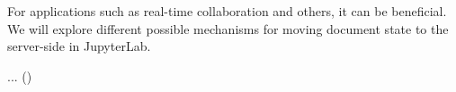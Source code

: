 \begin{task}[
  title=Server-side Document State,
  id=server-state,
  lead=UPSUD,
  PM=20,
  wphases={0-48},
  partners={UPSUD,SRL,QS}
]
  For applications such as real-time collaboration and others,
  it can be beneficial.
  We will explore different possible mechanisms for moving document state
  to the server-side in JupyterLab.

  \begin{compactitem}
  \item ...
    ()
  \end{compactitem}
\end{task}
